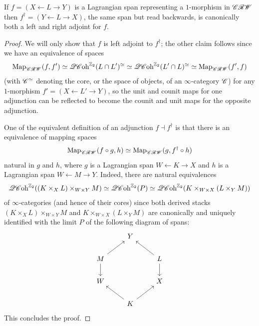 \begin{prp} \label{prp:adjoints}
	If $f = (X \leftarrow L \rightarrow Y)$ is a Lagrangian span representing a $1$-morphism in $\mathscr{CRW}$ then $f^\dagger = (Y \leftarrow L \rightarrow X)$, the same span but read backwards, is canonically both a left and right adjoint for $f$.
\end{prp}

\begin{proof}
	We will only show that $f$ is left adjoint to $f^\dagger$; the other claim follows since we have an equivalence of spaces
	\begin{equation*}
		\mathrm{Map}_{\mathscr{CRW}}(f,f') \simeq \mathscr{QC}\mathrm{oh}^{\mathbb{Z}_2}(L \cap L')^\simeq \simeq \mathscr{QC}\mathrm{oh}^{\mathbb{Z}_2}(L' \cap L)^\simeq \simeq \mathrm{Map}_{\mathscr{CRW}}(f',f)
	\end{equation*}
	(with $\mathscr{C}^\simeq$ denoting the core, or the space of objects, of an $\infty$-category $\mathscr{C}$) for any $1$-morphism $f' = (X \leftarrow L' \rightarrow Y)$, so the unit and counit maps for one adjunction can be reflected to become the counit and unit maps for the opposite adjunction.
	
	One of the equivalent definition of an adjunction $f \dashv f^\dagger$ is that there is an equivalence of mapping spaces
	\begin{equation*}
		\mathrm{Map}_{\mathscr{CRW}}(f \circ g, h) \simeq \mathrm{Map}_{\mathscr{CRW}}(g, f^\dagger \circ h)
	\end{equation*}
	natural in $g$ and $h$, where $g$ is a Lagrangian span $W \leftarrow K \rightarrow X$ and $h$ is a Lagrangian span $W \leftarrow M \rightarrow Y$. Indeed, there are natural equivalences
	\begin{equation*}
		\mathscr{QC}\mathrm{oh}^{\mathbb{Z}_2}((K \times_X L) \times_{W \times Y} M) \simeq \mathscr{QC}\mathrm{oh}^{\mathbb{Z}_2}(P) \simeq \mathscr{QC}\mathrm{oh}^{\mathbb{Z}_2}(K \times_{W \times X} (L \times_Y M))
	\end{equation*}
	of $\infty$-categories (and hence of their cores) since both derived stacks $(K \times_X L) \times_{W \times Y} M$ and $K \times_{W \times X} (L \times_Y M)$ are canonically and uniquely identified with the limit $P$ of the following diagram of spans:
	\begin{equation*}
		\begin{tikzcd}
			& Y & \\
			M \ar[ur] \ar[d] & & L \ar[ul] \ar[d] \\
			W & & X \\
			& K \ar[ul] \ar[ur] &
		\end{tikzcd}
	\end{equation*}
	This concludes the proof.
\end{proof}

